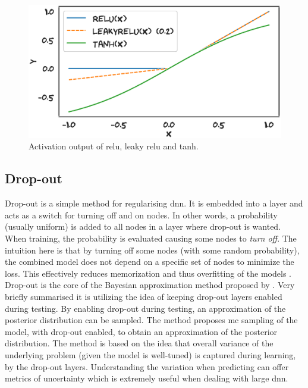 \begin{figure}
    \centering
    \includegraphics[width=\textwidth]{chapters/figures/relu_leakyrelu_example.eps}
    \caption{Activation output of \gls{relu}, leaky \gls{relu} and tanh.}
    \label{fig:leakyrelu}
\end{figure}


\subsection{Drop-out}\label{subsec:dropout}
Drop-out is a simple method for regularising \gls{dnn}. It is embedded into a layer and acts as a switch for turning off and on nodes. In other words, a probability (usually uniform) is added to all nodes in a layer where drop-out is wanted. When training, the probability is evaluated causing some nodes to \emph{turn off}. The intuition here is that by turning off some nodes (with some random probability), the combined model does not depend on a specific set of nodes to minimize the loss. This effectively reduces memorization and thus overfitting of the models \cite{Goodfellow-et-al-2016}. Drop-out is the core of the Bayesian approximation method proposed by \cite{Gal2015DropoutLearning}. Very briefly summarised it is utilizing the idea of keeping drop-out layers enabled during testing. By enabling drop-out during testing, an approximation of the posterior distribution can be sampled. The method proposes \gls{mc} sampling of the model, with drop-out enabled, to obtain an approximation of the posterior distribution. The method is based on the idea that overall variance of the underlying problem (given the model is well-tuned) is captured during learning, by the drop-out layers. Understanding the variation when predicting can offer metrics of uncertainty which is extremely useful when dealing with large \gls{dnn}.




